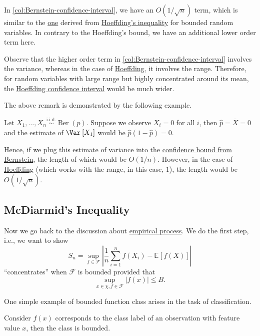 In \autoref{col:Bernstein-confidence-interval}, we have an \(O(1 / \sqrt{n} )\) term, which is similar to the \hyperref[rmk:Hoeffding-confidence-interval]{one} derived from \hyperref[thm:Hoeffding-inequality]{Hoeffding's inequality} for bounded random variables. In contrary to the Hoeffding's bound, we have an additional lower order term here.

\begin{remark}
	Observe that the higher order term in \autoref{col:Bernstein-confidence-interval} involves the variance, whereas in the case of \hyperref[rmk:Hoeffding-confidence-interval]{Hoeffding}, it involves the range. Therefore, for random variables with large range but highly concentrated around its mean, the \hyperref[rmk:Hoeffding-confidence-interval]{Hoeffding confidence interval} would be much wider.
\end{remark}

The above remark is demonstrated by the following example.

\begin{eg}
	Let \(X_1 , \dots , X_n \overset{\text{i.i.d.} }{\sim } \mathop{\mathrm{Ber}}(p) \). Suppose we observe \(X_i = 0\) for all \(i\), then \(\hat{p} = \overline{X} = 0\) and the estimate of \(\Var_{}\left[X_1 \right] \) would be \(\hat{p} (1 - \hat{p} ) = 0\).

	Hence, if we plug this estimate of variance into the \hyperref[col:Bernstein-confidence-interval]{confidence bound from Bernstein}, the length of which would be \(O(1 / n)\). However, in the case of \hyperref[rmk:Hoeffding-confidence-interval]{Hoeffding} (which works with the range, in this case, \(1\)), the length would be \(O(1 / \sqrt{n} )\).
\end{eg}

\subsection{McDiarmid's Inequality}
Now we go back to the discussion about \hyperref[def:EP]{empirical process}. We do the first step, i.e., we want to show
\[
	S_n = \sup _{f \in \mathscr{F} } \left\vert \frac{1}{n}\sum_{i=1}^{n} f(X_i) - \mathbb{E}_{}\left[f(X) \right]  \right\vert
\]
``concentrates'' when \(\mathscr{F} \) is bounded provided that
\[
	\sup _{x\in \chi , f\in \mathscr{F} } \vert f(x) \vert \leq B.
\]

One simple example of bounded function class arises in the task of classification.

\begin{eg}[Classification]
	Consider \(f(x)\) corresponds to the class label of an observation with feature value \(x\), then the class is bounded.
\end{eg}


